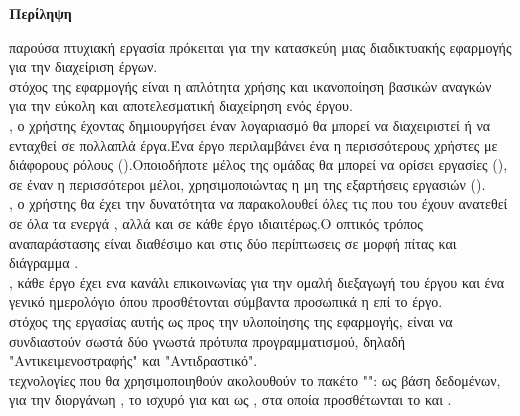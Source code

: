 \thispagestyle{plain}
\begin{center}
    \Large
    \textbf{}
    
    \vspace{0.4cm}
    \Large
    
    
    \vspace{0.9cm}
    \huge
    \textbf{Περίληψη}
\end{center}
 παρούσα πτυχιακή εργασία πρόκειται για την κατασκεύη μιας διαδικτυακής εφαρμογής για την διαχείριση έργων.\\
 στόχος της εφαρμογής είναι η απλότητα χρήσης και ικανοποίηση βασικών αναγκών για την εύκολη και αποτελεσματική διαχείρηση ενός έργου.\\
, ο χρήστης έχοντας δημιουργήσει έναν λογαριασμό θα μπορεί να διαχειριστεί ή να ενταχθεί σε πολλαπλά έργα.Ένα έργο περιλαμβάνει ένα η περισσότερους χρήστες με διάφορους ρόλους ().Οποιοδήποτε μέλος της ομάδας θα μπορεί να ορίσει εργασίες (), σε έναν η περισσότεροι μέλοι, χρησιμοποιώντας η μη της εξαρτήσεις εργασιών ().\\
, ο χρήστης θα έχει την δυνατότητα να παρακολουθεί όλες τις  που του έχουν ανατεθεί σε όλα τα ενεργά , αλλά και σε κάθε έργο ιδιαιτέρως.Ο οπτικός τρόπος αναπαράστασης είναι διαθέσιμο και στις δύο περίπτωσεις σε μορφή πίτας και διάγραμμα .\\
, κάθε έργο έχει ενα κανάλι επικοινωνίας για την ομαλή διεξαγωγή του έργου και ένα γενικό ημερολόγιο όπου προσθέτονται σύμβαντα προσωπικά η επί το έργο.\\
 στόχος της εργασίας αυτής ως προς την υλοποίησης της εφαρμογής, είναι να συνδιαστούν σωστά δύο γνωστά πρότυπα προγραμματισμού, δηλαδή "Αντικειμενοστραφής" και "Αντιδραστικό".\\
 τεχνολογίες που θα χρησιμοποιηθούν ακολουθούν το πακέτο "":  ως βάση δεδομένων,  για την διοργάνωη , το ισχυρό  για  και  ως , στα οποία προσθέτωνται το  και .